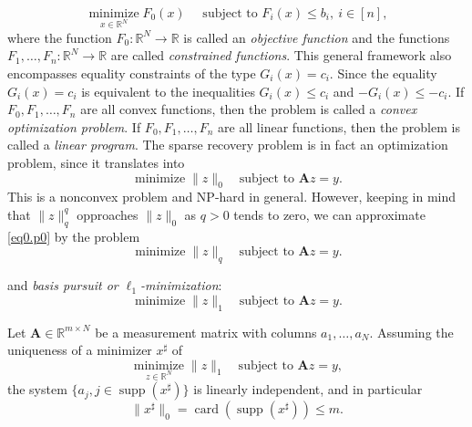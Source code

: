 \[
    \mathop{\text{minimize}}\limits_{x \in \mathbb{R}^N} F_0(x) \quad \text{ subject to } F_i(x) \leq b_i,\ i \in [n],
\]
where the function $F_0 : \mathbb{R}^N \rightarrow \mathbb{R}$ is called an \emph{\textcolor[rgb]{1,0,0}{objective function}} and the functions $F_1,\dots,F_n : \mathbb{R}^N \rightarrow \mathbb{R}$ are called \emph{\textcolor[rgb]{1,0,0}{constrained functions}}. This general framework also encompasses equality constraints of the type $G_i(x) = c_i$. Since the equality $G_i(x) = c_i$ is equivalent to the inequalities $G_i(x) \leq c_i$ and $-G_i(x) \leq -c_i$. If $F_0, F_1, \dots, F_n$ are all convex functions, then the problem is called a \emph{\textcolor[rgb]{1,0,0}{convex optimization problem}}. If $F_0, F_1, \dots, F_n$ are all linear functions, then the problem is called a \emph{\textcolor[rgb]{1,0,0}{linear program}}. The sparse recovery problem is in fact an optimization problem, since it translates into
\begin{equation}
    \mathop{\mathrm{minimize}}\|z\|_0 \quad \text{subject to } \mathbf{A}z = y. \tag{$P_0$}
    \label{eq0.p0}
\end{equation}
This is a nonconvex problem and NP-hard in general. However, keeping in mind that $\|z\|_q^q$ opproaches $\|z\|_0$ as $q>0$ tends to zero, we can approximate \cref{eq0.p0} by the problem
\begin{equation}
    \mathop{\mathrm{minimize}}\|z\|_q \quad \text{subject to } \mathbf{A}z = y. \tag{$P_q$}
    \label{eq0.pq}
\end{equation}

and \emph{\textcolor[rgb]{1,0,0}{basis pursuit or $\ell_1$-minimization}}:
\begin{equation}
    \mathop{\mathrm{minimize}} \|z\|_1 \quad \text{subject to } \mathbf{A}z = y. \tag{$P_1$}
    \label{eq0.p1}
\end{equation}

\begin{theorem}
    \label{th0.3.1}
    Let $\mathbf{A} \in \mathbb{R}^{m \times N}$ be a measurement matrix with columns $a_1, \dots, a_N$. Assuming the uniqueness of a minimizer $x^{\sharp}$ of 
    \[
        \mathop{\mathrm{minimize}}\limits_{z \in \mathbb{R}^N} \|z\|_1 \quad \text{subject to } \mathbf{A}z = y,
    \]
    the system $\{a_j, j\in \mathop{\mathrm{supp}}(x^{\sharp})\}$ is linearly independent, and in particular 
    \[
        \|x^{\sharp}\|_0 = \mathop{\mathrm{card}}(\mathop{\mathrm{supp}}(x^{\sharp})) \leq m.
    \]
\end{theorem}


